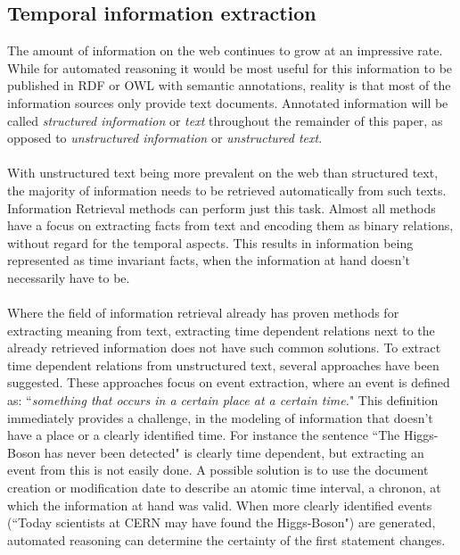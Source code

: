 \documentclass{llncs}
\begin{document}

\subsection{Temporal information extraction}
\label{sec:tempinf}
The amount of information on the web continues to grow at an impressive rate. While for automated reasoning it would be most useful for this information to be published in RDF or OWL with semantic annotations, reality is that most of the information sources only provide text documents. Annotated information will be called \emph{structured information} or \emph{text} throughout the remainder of this paper, as opposed to \emph{unstructured information} or \emph{unstructured text}.\\
\\
With unstructured text being more prevalent on the web than structured text, the majority of information needs to be retrieved automatically from such texts. Information Retrieval methods can perform just this task. Almost all methods have a focus on extracting facts from text and encoding them as binary relations, without regard for the temporal aspects. This results in information being represented as time invariant facts, when the information at hand doesn't necessarily have to be.\\
\\
Where the field of information retrieval already has proven methods for extracting meaning from text,\cite{Poelmans2012}\cite{Steichen2012} extracting time dependent relations next to the already retrieved information does not have such common solutions. To extract time dependent relations from unstructured text, several approaches have been suggested. These approaches focus on event extraction, where an event is defined as: ``\emph{something that occurs in a certain place at a certain time.}"\cite{Becker2010} This definition immediately provides a challenge, in the modeling of information that doesn't have a place or a clearly identified time. For instance the sentence ``The Higgs-Boson has never been detected" is clearly time dependent, but extracting an event from this is not easily done. A possible solution is to use the document creation or modification date to describe an atomic time interval, a chronon, at which the information at hand was valid. When more clearly identified events (``Today scientists at CERN may have found the Higgs-Boson") are generated, automated reasoning can determine the certainty of the first statement changes.\\
\end{document}
